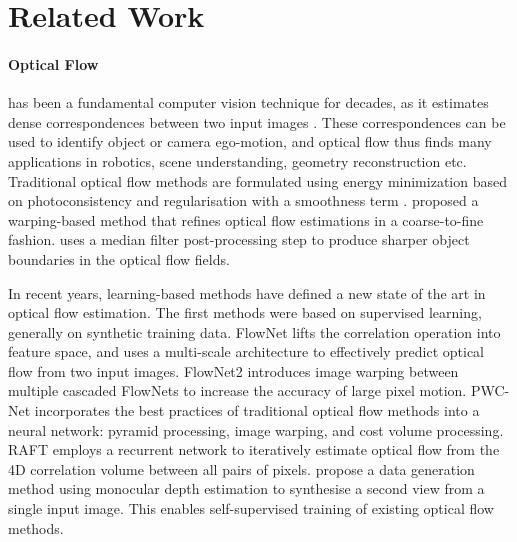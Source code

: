 \section{Related Work}

\paragraph{Optical Flow}

has been a fundamental computer vision technique for decades, as it estimates dense correspondences between two input images \cite{BakerSLRBS2011,MenzeHG2018}.
These correspondences can be used to identify object or camera ego-motion, and optical flow thus finds many applications in robotics, scene understanding, geometry reconstruction etc.
%
Traditional optical flow methods are formulated using energy minimization based on photoconsistency and regularisation with a smoothness term \cite{KroegTDV2016, HornS1981, LucasK1981, BlackA1991}.
%
\citet{BroxBPW2004} proposed a warping-based method that refines optical flow estimations in a coarse-to-fine fashion.
%
\citet{SunRB2014} uses a median filter post-processing step to produce sharper object boundaries in the optical flow fields.


In recent years, learning-based methods have defined a new state of the art in optical flow estimation.
%
%
The first methods were based on supervised learning, generally on synthetic training data.
%
FlowNet \cite{DosovFIHHGSCB2015} lifts the correlation operation into feature space, and uses a multi-scale architecture to effectively predict optical flow from two input images.
%
FlowNet2 \cite{IlgMSKDB2017} introduces image warping between multiple cascaded FlowNets to increase the accuracy of large pixel motion.
%
PWC-Net \cite{SunYLK2020} incorporates the best practices of traditional optical flow methods into a neural network: pyramid processing, image warping, and cost volume processing.
%
RAFT \cite{TeedD2020a} employs a recurrent network to iteratively estimate optical flow from the 4D correlation volume between all pairs of pixels. %
%
\citet{AleotPM2021} propose a data generation method using monocular depth estimation to synthesise a second view from a single input image.
This enables self-supervised training of existing optical flow methods.



